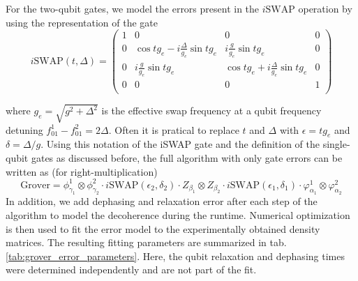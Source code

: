 For the two-qubit gates, we model the errors present in the $i\mathrm{SWAP}$ operation by using the representation of the gate
%
\begin{equation}
i\mathrm{SWAP}(t,\Delta) = \left(
			\begin{array}{cccc}
				1 & 0 & 0 & 0 \\
				0 & \cos{t g_{e}}-i\frac{\Delta}{g_{e}}\sin{t g_{e}} & i \frac{g}{g_e}\sin{t g_{e}} & 0 \\
				0 & i\frac{g}{g_e}\sin{t g_{e}} & \cos{t g_{e}}+i\frac{\Delta}{g_{e}}\sin{t g_{e}} & 0 \\
				0 & 0 & 0 & 1 \\
			\end{array}
	\right) \label{eq:swap_with_detuning}
\end{equation}
%


where $g_e = \sqrt{g^2+\Delta^2}$ is the effective swap frequency at a qubit frequency detuning $f_{01}^1-f_{01}^2 = 2\Delta$. Often it is pratical to replace $t$ and $\Delta$ with $\epsilon = t g_{e}$ and $\delta = \Delta / g$. Using this notation of the iSWAP gate and the definition of the single-qubit gates as discussed before, the full algorithm with only gate errors can be written as (for right-multiplication)
%
\begin{equation}
\mathrm{Grover} = \phi_{\gamma_1}^1\otimes \phi_{\gamma_2}^2\cdot i\mathrm{SWAP}(\epsilon_2,\delta_2)\cdot Z_{\beta_1}\otimes Z_{\beta_2}\cdot i\mathrm{SWAP}(\epsilon_1,\delta_1)\cdot\varphi_{\alpha_1}^1\otimes \varphi_{\alpha_2}^2 \label{eq:grover_error_model}
\end{equation}
%
In addition, we add dephasing and relaxation error after each step of the algorithm to model the decoherence during the runtime. Numerical optimization is then used to fit the error model to the experimentally obtained density matrices. The resulting fitting parameters are summarized in tab. \ref{tab:grover_error_parameters}. Here, the qubit relaxation and dephasing times were determined independently and are not part of the fit.


